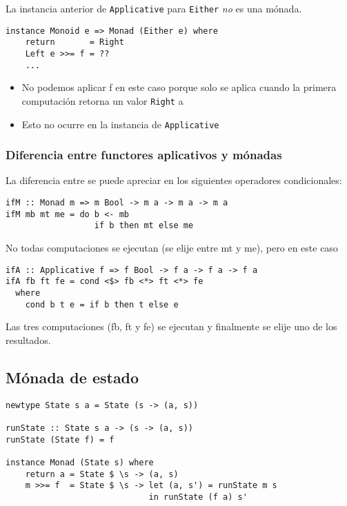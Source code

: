 \documentclass{article}
\newcommand{\imp}[1]{\textcolor{color1}{#1}}
\begin{document}
La instancia anterior de \imp{\texttt{Applicative}} para \imp{\texttt{Either}} \emph{no} es una mónada.

\begin{lstlisting}
instance Monoid e => Monad (Either e) where
    return       = Right
    Left e >>= f = ??
    ...
\end{lstlisting}

\begin{itemize}
\item No podemos aplicar f en este caso porque solo se aplica cuando la primera computación retorna un valor \imp{\texttt{Right} a}
\item Esto no ocurre en la instancia de \imp{\texttt{Applicative}}
\end{itemize}

\subsubsection{Diferencia entre functores aplicativos y mónadas}

La diferencia entre se puede apreciar en los siguientes operadores condicionales:

\begin{lstlisting}
ifM :: Monad m => m Bool -> m a -> m a -> m a
ifM mb mt me = do b <- mb
                  if b then mt else me
\end{lstlisting}
No todas computaciones se ejecutan (se elije entre mt y me), pero en este caso 
\begin{lstlisting}
ifA :: Applicative f => f Bool -> f a -> f a -> f a
ifA fb ft fe = cond <$> fb <*> ft <*> fe
  where
    cond b t e = if b then t else e
\end{lstlisting}

Las tres computaciones (fb, ft y fe) se ejecutan y finalmente se elije uno de los resultados.

\subsection{Mónada de estado}

\begin{lstlisting}
newtype State s a = State (s -> (a, s))

runState :: State s a -> (s -> (a, s))
runState (State f) = f

instance Monad (State s) where
    return a = State $ \s -> (a, s)
    m >>= f  = State $ \s -> let (a, s') = runState m s
                             in runState (f a) s'
\end{lstlisting}
\end{document}

